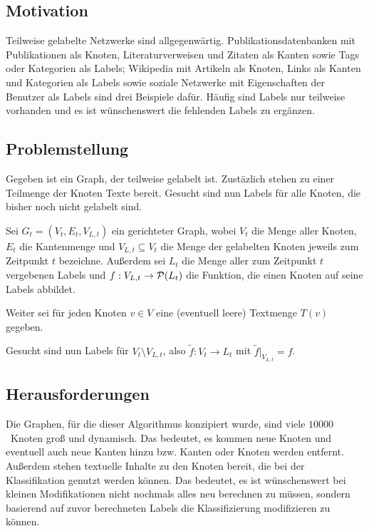 \subsection{Motivation}
Teilweise gelabelte Netzwerke sind allgegenwärtig. Publikationsdatenbanken
mit Publikationen als Knoten, Literaturverweisen und Zitaten als Kanten
sowie Tags oder Kategorien als Labels;
Wikipedia mit Artikeln als Knoten, Links als Kanten und Kategorien
als Labels sowie soziale Netzwerke mit Eigenschaften der Benutzer
als Labels sind drei Beispiele dafür.
Häufig sind Labels nur teilweise vorhanden und es ist wünschenswert die 
fehlenden Labels zu ergänzen. 

\subsection{Problemstellung}
Gegeben ist ein Graph, der teilweise gelabelt ist. Zustäzlich stehen
zu einer Teilmenge der Knoten Texte bereit. Gesucht sind nun Labels
für alle Knoten, die bisher noch nicht gelabelt sind.\\

\begin{definition}[Knotenklassifierungsproblem]\label{def:Knotenklassifizierungsproblem}
    Sei $G_t = (V_t, E_t, V_{L,t})$ ein gerichteter Graph,
    wobei $V_t$ die Menge aller Knoten,
    $E_t$ die Kantenmenge und $V_{L,t} \subseteq V_t$ die Menge der 
    gelabelten Knoten jeweils zum Zeitpunkt $t$ bezeichne.
    Außerdem sei $L_t$ die Menge aller zum Zeitpunkt $t$ vergebenen
    Labels und $f:V_{L,t} \rightarrow \mathcal{P}(L_t)$ die Funktion, die einen
    Knoten auf seine Labels abbildet.

    Weiter sei für jeden Knoten $v \in V$ eine (eventuell leere)
    Textmenge $T(v)$ gegeben.

    Gesucht sind nun Labels für $V_t \setminus V_{L,t}$, also
    $\tilde{f}: V_t \rightarrow L_t$ mit 
    $\tilde{f}|_{V_{L,t}} = f$.
\end{definition}

\subsection{Herausforderungen}
Die Graphen, für die dieser Algorithmus konzipiert wurde,
sind viele $\num{10000}$~Knoten groß und dynamisch. Das bedeutet, es 
kommen neue Knoten und eventuell auch neue Kanten hinzu bzw. Kanten 
oder Knoten werden entfernt. Außerdem stehen textuelle Inhalte zu den 
Knoten bereit, die bei der Klassifikation genutzt werden können.
Das bedeutet, es ist wünschenswert bei kleinen Modifikationen nicht
nochmals alles neu berechnen zu müssen, sondern basierend auf zuvor
berechneten Labels die Klassifizierung modifizieren zu können.
